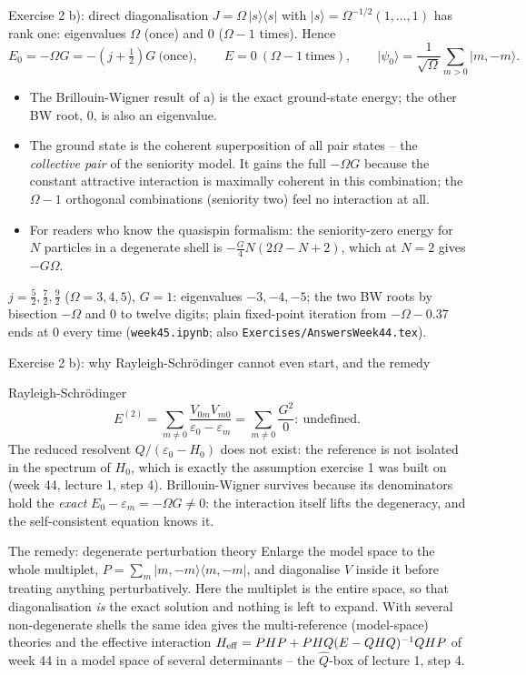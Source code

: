 \documentclass[aspectratio=169,10pt]{beamer}
\newcommand{\numbox}[1]{%
  \begin{tcolorbox}[colback=palegreen,colframe=teal!70!black,title={\bfseries Measured}]
  #1
  \end{tcolorbox}}
\newcommand{\ket}[1]{\vert #1\rangle}
\newcommand{\bra}[1]{\langle #1\vert}
\begin{document}
\begin{frame}[shrink=5]{Exercise 2 b): direct diagonalisation}
\(J=\Omega\,\ket{s}\bra{s}\) with \(\ket{s}=\Omega^{-1/2}(1,\dots,1)\) has rank one: eigenvalues \(\Omega\) (once) and \(0\) (\(\Omega-1\) times). Hence
\[
E_0=-\Omega G=-(j+\tfrac12)G\ \text{(once)},\qquad E=0\ (\Omega-1\ \text{times}),\qquad
\ket{\psi_0}=\frac{1}{\sqrt\Omega}\sum_{m>0}\ket{m,-m}.
\]
\begin{itemize}
\item The Brillouin-Wigner result of a) is the exact ground-state energy; the other BW root, \(0\), is also an eigenvalue.
\item The ground state is the coherent superposition of all pair states -- the \emph{collective pair} of the seniority model. It gains the full \(-\Omega G\) because the constant attractive interaction is maximally coherent in this combination; the \(\Omega-1\) orthogonal combinations (seniority two) feel no interaction at all.
\item For readers who know the quasispin formalism: the seniority-zero energy for \(N\) particles in a degenerate shell is \(-\tfrac G4N(2\Omega-N+2)\), which at \(N=2\) gives \(-G\Omega\).
\end{itemize}
\numbox{\(j=\tfrac52,\tfrac72,\tfrac92\) (\(\Omega=3,4,5\)), \(G=1\): eigenvalues \(-3,-4,-5\); the two BW roots by bisection \(-\Omega\) and \(0\) to twelve digits; plain fixed-point iteration from \(-\Omega-0.37\) ends at \(0\) every time (\texttt{week45.ipynb}; also \texttt{Exercises/AnswersWeek44.tex}).}
\end{frame}

\begin{frame}[shrink=5]{Exercise 2 b): why Rayleigh-Schr\"odinger cannot even start, and the remedy}
\begin{alertblock}{Rayleigh-Schr\"odinger}
\[
E^{(2)}=\sum_{m\ne0}\frac{V_{0m}V_{m0}}{\varepsilon_0-\varepsilon_m}=\sum_{m\ne0}\frac{G^2}{0}:\ \text{undefined.}
\]
The reduced resolvent \(Q/(\varepsilon_0-H_0)\) does not exist: the reference is not isolated in the spectrum of \(H_0\), which is exactly the assumption exercise 1 was built on (week 44, lecture 1, step 4). Brillouin-Wigner survives because its denominators hold the \emph{exact} \(E_0-\varepsilon_m=-\Omega G\ne0\): the interaction itself lifts the degeneracy, and the self-consistent equation knows it.
\end{alertblock}
\begin{block}{The remedy: degenerate perturbation theory}
Enlarge the model space to the whole multiplet, \(P=\sum_m\ket{m,-m}\bra{m,-m}\), and diagonalise \(V\) inside it before treating anything perturbatively. Here the multiplet is the entire space, so that diagonalisation \emph{is} the exact solution and nothing is left to expand. With several non-degenerate shells the same idea gives the multi-reference (model-space) theories and the effective interaction \(H_{\rm eff}=PHP+PHQ(E-QHQ)^{-1}QHP\) of week 44 in a model space of several determinants -- the \(\hat Q\)-box of lecture 1, step 4.
\end{block}
\end{frame}
\end{document}
